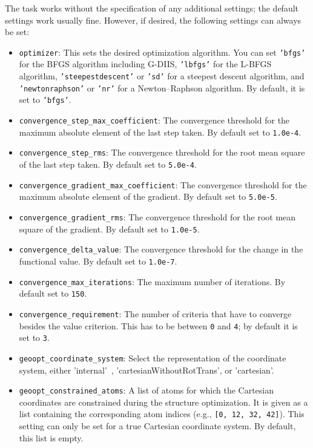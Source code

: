 \documentclass[]{tufte-book}
\begin{document}
The task works without the specification of any additional settings; the default settings work usually fine. However,
if desired, the following settings can always be set:
\begin{itemize}
\item \texttt{optimizer}: This sets the desired optimization algorithm. You can set \texttt{'bfgs'} for the BFGS algorithm including
G-DIIS, \texttt{'lbfgs'} for the L-BFGS algorithm,
\texttt{'steepestdescent'} or \texttt{'sd'} for a steepest descent algorithm, and \texttt{'newtonraphson'} or \texttt{'nr'} for
a Newton--Raphson algorithm. By default, it is set to \texttt{'bfgs'}.
\item \texttt{convergence\_step\_max\_coefficient}: The convergence threshold for the maximum absolute element of the last step taken.
By default set to \texttt{1.0e-4}.
\item \texttt{convergence\_step\_rms}: The convergence threshold for the root mean square of the last step taken. By default set to
\texttt{5.0e-4}.
\item \texttt{convergence\_gradient\_max\_coefficient}: The convergence threshold for the maximum absolute element of the gradient.
By default set to \texttt{5.0e-5}.
\item \texttt{convergence\_gradient\_rms}: The convergence threshold for the root mean square of the gradient. By default set to
\texttt{1.0e-5}.
\item \texttt{convergence\_delta\_value}: The convergence threshold for the change in the functional value. By default set to
\texttt{1.0e-7}.
\item \texttt{convergence\_max\_iterations}: The maximum number of iterations. By default set to \texttt{150}.
\item \texttt{convergence\_requirement}: The number of criteria that have to converge besides the value criterion. This
has to be between \texttt{0} and \texttt{4}; by default it is set to \texttt{3}.
\item \texttt{geoopt\_coordinate\_system}: Select the representation of the coordinate system, either 'internal'~\cite{libirc}, 'cartesianWithoutRotTrans', or 'cartesian'.
\item \texttt{geoopt\_constrained\_atoms}: A list of atoms for which the Cartesian coordinates are constrained during the structure optimization.
  It is given as a list containing the corresponding atom indices (e.g., \texttt{[0, 12, 32, 42]}). This setting can only be set for a true Cartesian coordinate system.
By default, this list is empty.

\end{itemize}
\end{document}
